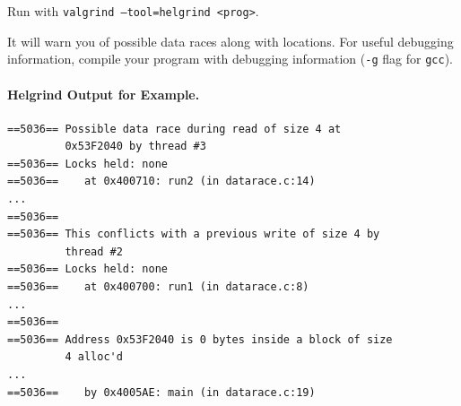 \documentclass[11pt]{article}
\begin{document}
Run with {\tt valgrind --tool=helgrind <prog>}.

It will warn you of possible data races along with locations. For
useful debugging information, compile your program with debugging
information ({\tt -g} flag for {\tt gcc}).

\paragraph{Helgrind Output for Example.}
\begin{lstlisting}
==5036== Possible data race during read of size 4 at
         0x53F2040 by thread #3
==5036== Locks held: none
==5036==    at 0x400710: run2 (in datarace.c:14)
...
==5036== 
==5036== This conflicts with a previous write of size 4 by
         thread #2
==5036== Locks held: none
==5036==    at 0x400700: run1 (in datarace.c:8)
...
==5036== 
==5036== Address 0x53F2040 is 0 bytes inside a block of size
         4 alloc'd
...
==5036==    by 0x4005AE: main (in datarace.c:19)
\end{lstlisting}
\end{document}
